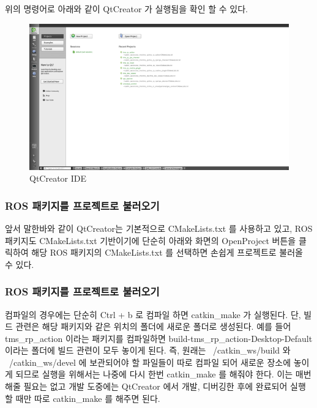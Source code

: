 \noindent
위의 명령어로 아래와 같이 QtCreator 가 실행됨을 확인 할 수 있다.

\begin{figure}[h]
\centering\includegraphics[width=0.9\columnwidth]{pictures/chapter2/qtcreator1.png}
\caption{QtCreator IDE}
\end{figure}

\subsubsection{ROS 패키지를 프로젝트로 불러오기}
앞서 말한바와 같이 QtCreator는 기본적으로 CMakeLists.txt 를 사용하고 있고, ROS 패키지도 CMakeLists.txt 기반이기에 단순히 아래와 화면의 OpenProject 버튼을 클릭하여 해당 ROS 패키지의 CMakeLists.txt 를 선택하면 손쉽게 프로젝트로 불러올 수 있다.

\subsubsection{ROS 패키지를 프로젝트로 불러오기}
컴파일의 경우에는 단순히 Ctrl + b 로 컴파일 하면 catkin\_make 가 실행된다. 단, 빌드 관련은 해당 패키지와 같은 위치의 폴더에 새로운 폴더로 생성된다. 예를 들어 tms\_rp\_action 이라는 패키지를 컴파일하면 build-tms\_rp\_action-Desktop-Default 이라는 폴더에 빌드 관련이 모두 놓이게 된다. 즉,  원래는 ~/catkin\_ws/build 와 ~/catkin\_ws/devel 에 보관되어야 할 파일들이 따로 컴파일 되어 새로운 장소에 놓이게 되므로 실행을 위해서는 나중에 다시 한번 catkin\_make 를 해줘야 한다. 이는 매번 해줄 필요는 없고 개발 도중에는 QtCreator 에서 개발, 디버깅한 후에 완료되어 실행할 때만 따로 catkin\_make 를 해주면 된다. 

